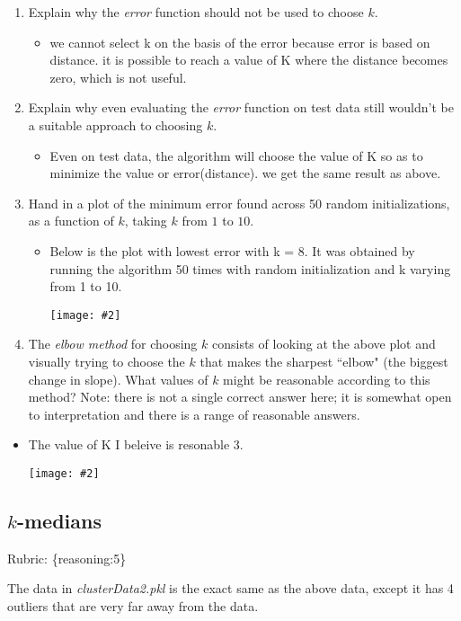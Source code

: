 \documentclass{article}
\def\gre#1{{\color{gre}#1}}
\newcommand{\centerfig}[2]{\begin{center}\texttt{[image: \#2]}\end{center}}
\def\items#1{\begin{itemize}#1\end{itemize}}
\def\enum#1{\begin{enumerate}#1\end{enumerate}}
\def\rubric#1{\gre{Rubric: \{#1\}}}{}
\begin{document}
{ {\enum{
 \item Explain why the \emph{error} function should not be used to choose $k$.
\items{
\item we cannot select k on the basis of the error because error is based on distance. it is possible to reach a value of K where the distance becomes zero, which is not useful.
}
 \item Explain why even evaluating the \emph{error} function on test data still wouldn't be a suitable approach to choosing $k$.
\items{
\item Even on test data, the algorithm will choose the value of K so as to minimize the value or error(distance). we get the same result as above.
}
 \item Hand in a plot of the minimum error found across 50 random initializations, as a function of $k$, taking $k$ from $1$ to $10$.
\items{
\item Below is the plot with lowest error with  k = 8. It was obtained by running the algorithm 50 times with random initialization and k varying from 1 to 10. \centerfig{.5}{../figs/kmeans_3_2_3.png}
}
 \item The \emph{elbow method} for choosing $k$ consists of looking at the above plot and visually trying to choose the $k$ that
 makes the sharpest ``elbow" (the biggest change in slope). What values of $k$ might be reasonable according to this method? Note: there is not a single correct answer here; it is somewhat open to interpretation and there is a range of reasonable answers.
 }
\items{ 
\item The value of K I beleive is resonable 3. \centerfig{.5}{../figs/q3_2_4_tree_errors.pdf}
}

 \subsection{$k$-medians}
\rubric{reasoning:5}

 The data in \emph{clusterData2.pkl} is the exact same as the above data, except it has 4 outliers that are very far away from the data.

}}
\end{document}
